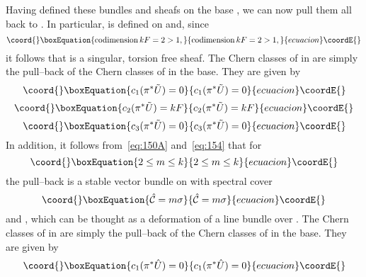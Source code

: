 \documentclass[a4paper,12pt]{article}
\numberwithin{equation}{section}
\def\cC{{\mathcal C}}
\def\cN{{\mathcal N}}
\theoremstyle{plain}
\begin{document}
Having defined these bundles and sheafs on the base \coordHE{}, we can now pull them
all back to \coordHE{}. In particular, \coordHE{} is defined on \coordHE{}
and, since
\begin{equation}\coord{}\boxEquation{
\operatorname{codimension}   kF= 2 > 1,
\label{eq:171}
}{
\operatorname{codimension}   kF= 2 > 1,
}{ecuacion}\coordE{}\end{equation}
it follows that \coordHE{} is a singular, torsion free sheaf.
The Chern classes of \coordHE{} in \coordHE{} are simply the 
pull--back of the Chern classes of \coordHE{} in the base. They are given by
\begin{equation}\coord{}\boxEquation{
c_{1}(\pi^{*}\tilde{U})=0
\label{eq:172}
}{
c_{1}(\pi^{*}\tilde{U})=0
}{ecuacion}\coordE{}\end{equation}
\begin{equation}\coord{}\boxEquation{
c_{2}(\pi^{*}\tilde{U})=kF
\label{eq:173}
}{
c_{2}(\pi^{*}\tilde{U})=kF
}{ecuacion}\coordE{}\end{equation}
\begin{equation}\coord{}\boxEquation{
c_{3}(\pi^{*}\tilde{U})=0
\label{eq:174}
}{
c_{3}(\pi^{*}\tilde{U})=0
}{ecuacion}\coordE{}\end{equation}
In addition, it follows from~\eqref{eq:150A} and~\eqref{eq:154} that for
\begin{equation}\coord{}\boxEquation{
2\leq m \leq k
\label{eq:174A}
}{
2\leq m \leq k
}{ecuacion}\coordE{}\end{equation}
the pull--back \coordHE{} is a stable \coordHE{}
vector bundle on \coordHE{} with spectral cover
\begin{equation}\coord{}\boxEquation{
\hat{\cC}= m\sigma
\label{eq:175}
}{
\hat{\cC}= m\sigma
}{ecuacion}\coordE{}\end{equation}
and \myHighlight{$\widehat{\cN}=\widehat{U}$}\coordHE{}, which can be 
thought as a deformation of a line bundle over \coordHE{}. 
The Chern classes of \coordHE{} in \coordHE{} are simply the 
pull--back of the
Chern classes of \coordHE{} in the base. They are given by
\begin{equation}\coord{}\boxEquation{
c_{1}(\pi^{*}\hat{U})=0
\label{eq:177}
}{
c_{1}(\pi^{*}\hat{U})=0
}{ecuacion}\coordE{}\end{equation}
\end{document}
